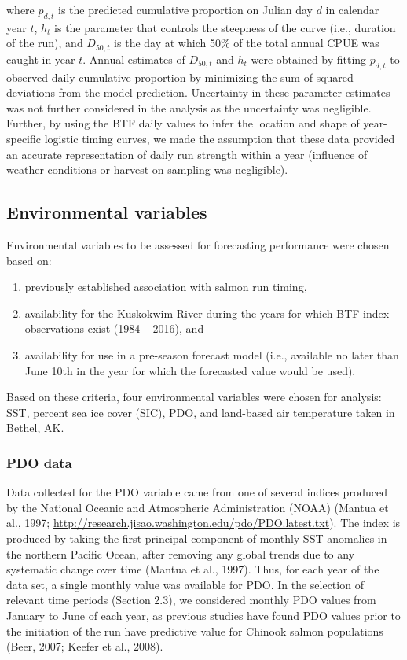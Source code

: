 \documentclass[12pt,]{book}
\providecommand{\tightlist}{%
  \setlength{\itemsep}{0pt}\setlength{\parskip}{0pt}}
\theoremstyle{definition}
\theoremstyle{definition}
\theoremstyle{definition}
\theoremstyle{remark}
\begin{document}
where \(p_{d,t}\) is the predicted cumulative proportion on Julian day
\(d\) in calendar year \(t\), \(h_t\) is the parameter that controls the
steepness of the curve (i.e., duration of the run), and \(D_{50,t}\) is
the day at which 50\% of the total annual CPUE was caught in year \(t\).
Annual estimates of \(D_{50,t}\) and \(h_t\) were obtained by fitting
\(p_{d,t}\) to observed daily cumulative proportion by minimizing the
sum of squared deviations from the model prediction. Uncertainty in
these parameter estimates was not further considered in the analysis as
the uncertainty was negligible. Further, by using the BTF daily values
to infer the location and shape of year-specific logistic timing curves,
we made the assumption that these data provided an accurate
representation of daily run strength within a year (influence of weather
conditions or harvest on sampling was negligible).

\subsection{Environmental variables}\label{environmental-variables}

\noindent
Environmental variables to be assessed for forecasting performance were
chosen based on:

\begin{enumerate}
\def\labelenumi{\arabic{enumi}.}
\tightlist
\item
  previously established association with salmon run timing,
\item
  availability for the Kuskokwim River during the years for which BTF
  index observations exist (1984 -- 2016), and
\item
  availability for use in a pre-season forecast model (i.e., available
  no later than June 10th in the year for which the forecasted value
  would be used).
\end{enumerate}

Based on these criteria, four environmental variables were chosen for
analysis: SST, percent sea ice cover (SIC), PDO, and land-based air
temperature taken in Bethel, AK.

\subsubsection{PDO data}\label{pdo-data}

\noindent
Data collected for the PDO variable came from one of several indices
produced by the National Oceanic and Atmospheric Administration (NOAA)
(Mantua et al., 1997;
\url{http://research.jisao.washington.edu/pdo/PDO.latest.txt}). The
index is produced by taking the first principal component of monthly SST
anomalies in the northern Pacific Ocean, after removing any global
trends due to any systematic change over time (Mantua et al., 1997).
Thus, for each year of the data set, a single monthly value was
available for PDO. In the selection of relevant time periods (Section
2.3), we considered monthly PDO values from January to June of each
year, as previous studies have found PDO values prior to the initiation
of the run have predictive value for Chinook salmon populations (Beer,
2007; Keefer et al., 2008).
\end{document}
